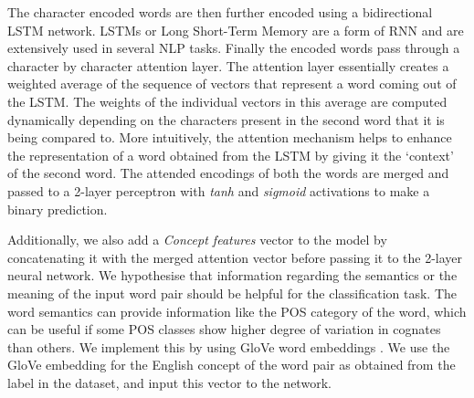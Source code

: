 \documentclass[11pt,letterpaper]{article}
\begin{document}
The character encoded words are then further encoded using a bidirectional LSTM network. LSTMs or Long Short-Term Memory are a form of RNN and are extensively used in several NLP tasks. Finally the encoded words pass through a character by character attention layer. The attention layer essentially creates a weighted average of the sequence of vectors that represent a word coming out of the LSTM. The weights of the individual vectors in this average are computed dynamically depending on the characters present in the second word that it is being compared to. More intuitively, the attention mechanism helps to enhance the representation of a word obtained from the LSTM by giving it the `context' of the second word. The attended encodings of both the words are merged and passed to a 2-layer perceptron with \textit{tanh} and \textit{sigmoid} activations to make a binary prediction. 

Additionally, we also add a \textit{Concept features} vector to the model by concatenating it with the merged attention vector before passing it to the 2-layer neural network. We hypothesise that information regarding the semantics or the meaning of the input word pair should be helpful for the classification task. The word semantics can provide information like the POS category of the word, which can be useful if some POS classes show higher degree of variation in cognates than others. We implement this by using GloVe word embeddings \cite{pennington2014glove}. We use the GloVe embedding for the English concept of the word pair as obtained from the label in the dataset, and input this vector to the network. 
\end{document}

